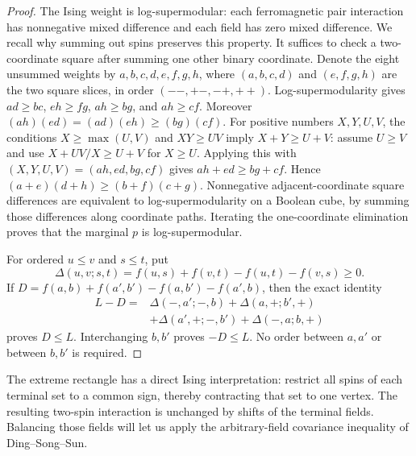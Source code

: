 \begin{proof}
The Ising weight is log-supermodular: each ferromagnetic pair interaction
has nonnegative mixed difference and each field has zero mixed difference.
We recall why summing out spins preserves this property.  It suffices to
check a two-coordinate square after summing one other binary coordinate.
Denote the eight unsummed weights by
\(a,b,c,d,e,f,g,h\), where \((a,b,c,d)\) and \((e,f,g,h)\)
are the two square slices, in order \((--,+-,-+,++)\).
Log-supermodularity gives
\(ad\ge bc\), \(eh\ge fg\),
\(ah\ge bg\), and \(ah\ge cf\).
Moreover \((ah)(ed)=(ad)(eh)\ge(bg)(cf)\).
For positive numbers \(X,Y,U,V\), the conditions
\(X\ge\max(U,V)\) and \(XY\ge UV\) imply
\(X+Y\ge U+V\): assume \(U\ge V\) and use
\(X+UV/X\ge U+V\) for \(X\ge U\).
Applying this with \((X,Y,U,V)=(ah,ed,bg,cf)\) gives
\(ah+ed\ge bg+cf\).  Hence
\((a+e)(d+h)\ge(b+f)(c+g)\).
Nonnegative adjacent-coordinate square differences are equivalent to
log-supermodularity on a Boolean cube, by summing those differences along
coordinate paths.  Iterating the one-coordinate elimination proves that
the marginal \(p\) is log-supermodular.

For ordered \(u\le v\) and \(s\le t\), put
\[
 \Delta(u,v;s,t)=f(u,s)+f(v,t)-f(u,t)-f(v,s)\ge0.
\]
If \(D=f(a,b)+f(a',b')-f(a,b')-f(a',b)\), then the exact identity
\[
\begin{split}
L-D={}&\Delta(-,a';-,b)+\Delta(a,+;b',+)\\
      &+\Delta(a',+;-,b')+\Delta(-,a;b,+)
\end{split}
\]
proves \(D\le L\).  Interchanging \(b,b'\) proves \(-D\le L\).
No order between \(a,a'\) or between \(b,b'\) is required.
\end{proof}

The extreme rectangle has a direct Ising interpretation: restrict all
spins of each terminal set to a common sign, thereby contracting that set
to one vertex. The resulting two-spin interaction is unchanged by shifts
of the terminal fields. Balancing those fields will let us apply the
arbitrary-field covariance inequality of Ding--Song--Sun.

